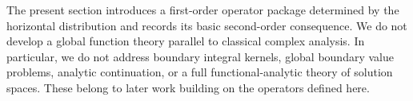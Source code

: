 The present section introduces a first-order operator package determined by the horizontal distribution and records its basic second-order consequence. We do not develop a global function theory parallel to classical complex analysis. In particular, we do not address boundary integral kernels, global boundary value problems, analytic continuation, or a full functional-analytic theory of solution spaces. These belong to later work building on the operators defined here.
